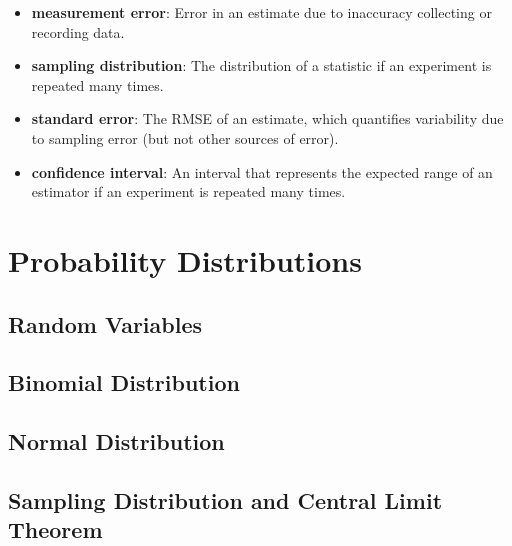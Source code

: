 \begin{itemize}
	\item {\bf measurement error}: Error in an estimate due to inaccuracy collecting
	or recording data. 
	
	\item {\bf sampling distribution}: The distribution of a statistic if an
	experiment is repeated many times.  
	
	\item {\bf standard error}: The RMSE of an estimate,
	which quantifies variability due to sampling error (but not
	other sources of error).
	
	\item {\bf confidence interval}: An interval that represents the expected
	range of an estimator if an experiment is repeated many times.
	 
	
\end{itemize}



 \chapter{Probability Distributions}
  \section{Random Variables}
  \section{ Binomial Distribution}
 \section{Normal Distribution}
 \section{Sampling Distribution and Central Limit Theorem}
